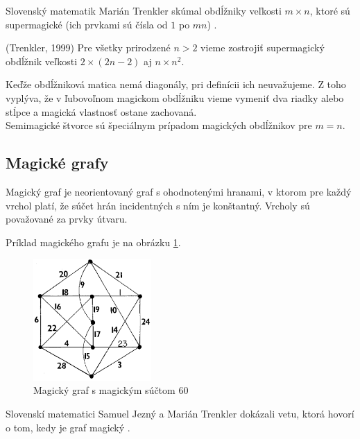 Slovenský matematik Marián Trenkler skúmal obdĺžniky veľkosti $m \times n$, ktoré sú supermagické (ich prvkami sú čísla od $1$ po $mn$) \cite{rectangles}.

\begin{subtheorem} (Trenkler, 1999) Pre všetky prirodzené $n > 2$ vieme zostrojiť supermagický obdĺžnik veľkosti $2 \times (2n - 2)$ aj $n \times n^2$.
\end{subtheorem}

Keďže obdĺžniková matica nemá diagonály, pri definícii ich neuvažujeme. Z toho vyplýva, že v ľubovoľnom magickom obdĺžniku vieme vymeniť dva riadky alebo stĺpce a magická vlastnosť ostane zachovaná. \\

Semimagické štvorce sú špeciálnym prípadom magických obdĺžnikov pre $m = n$. \\

\subsection{Magické grafy}
\begin{subdefinition} Magický graf je neorientovaný graf s ohodnotenými hranami, v ktorom pre každý vrchol platí, že súčet hrán incidentných s ním je konštantný. Vrcholy sú považované za prvky útvaru.
\end{subdefinition}

Príklad magického grafu je na obrázku \ref{obr:fig_magic_graph}.

\begin{figure}[H]
\centerline{\includegraphics[width=0.4\textwidth]{images/magic_graph}}
\caption[Magický graf]{Magický graf s magickým súčtom 60 \cite{regular}}
\label{obr:fig_magic_graph}
\end{figure}

Slovenskí matematici Samuel Jezný a Marián Trenkler dokázali vetu, ktorá hovorí o tom, kedy je graf magický \cite{graphs}.

